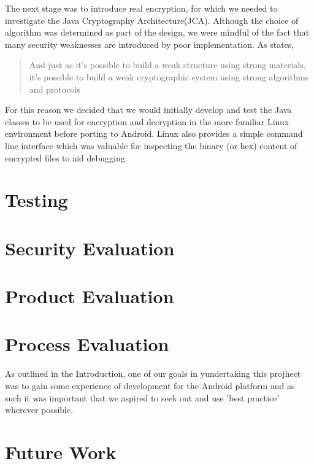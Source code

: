 The next stage was to introduce real encryption, for which we needed to investigate the Java Cryptography Architecture(JCA).  Although the choice of algorithm was determined as part of the design, we were mindful of the fact that  many security weaknesses are introduced by poor implementation. As \citet{schneier1998security} states,
\begin{quotation}
And just as it's possible to build a weak structure using strong materials, it's possible to build a weak cryptographic system using strong algorithms and protocols 
\end{quotation}  
For this reason we decided that we would initially develop and test the  Java classes to be used for encryption and decryption in the more familiar Linux environment before porting to Android.  Linux also provides a simple command line interface which was valuable for inspecting the binary (or hex) content of encrypted files to aid debugging.





\section{Testing}

\section{Security Evaluation}
\section{Product Evaluation}
\section{Process Evaluation}
As outlined in the Introduction, one of our goals in yundertaking this projhect was to gain some experience of development for the Android platform and as such it was important that we aspired to seek out and use 'best practice' wherever possible.  
\section{Future Work}



